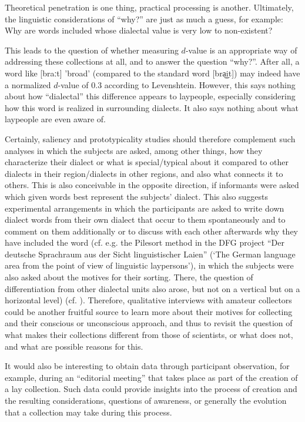 \documentclass[output=paper]{langscibook}
\begin{document}
\begin{sloppypar}
Theoretical penetration is one thing, practical processing is another. Ultimately, the linguistic considerations of “why?” are just as much a guess, for example: Why are words included whose dialectal value is very low to non-existent?
\end{sloppypar}

This leads to the question of whether measuring $d$-value is an appropriate way of addressing these collections at all, and to answer the question “why?”. After all, a word like [braːt] 'broad' (compared to the standard word [bra͜it]) may indeed have a normalized $d$-value of 0.3 according to Levenshtein. However, this says nothing about how “dialectal” this difference appears to laypeople, especially considering how this word is realized in surrounding dialects. It also says nothing about what laypeople are even aware of.

Certainly, saliency and prototypicality studies should therefore complement such analyses in which the subjects are asked, among other things, how they characterize their dialect or what is special/typical about it compared to other dialects in their region/dialects in other regions, and also what connects it to others. This is also conceivable in the opposite direction, if informants were asked which given words best represent the subjects’ dialect. This also suggests experimental arrangements in which the participants are asked to write down dialect words from their own dialect that occur to them spontaneously and to comment on them additionally or to discuss with each other afterwards why they have included the word (cf. e.g. the Pilesort method in the DFG project “Der deutsche Sprachraum aus der Sicht linguistischer Laien” (‘The German language area from the point of view of linguistic laypersons’), in which the subjects were also asked about the motives for their sorting. There, the question of differentiation from other dialectal units also arose, but not on a vertical but on a horizontal level) (cf. \citealt[52--54]{Schröder2017}). Therefore, qualitative interviews with amateur collectors could be another fruitful source to learn more about their motives for collecting and their conscious or unconscious approach, and thus to revisit the question of what makes their collections different from those of scientists, or what does not, and what are possible reasons for this.

It would also be interesting to obtain data through participant observation, for example, during an “editorial meeting” that takes place as part of the creation of a lay collection. Such data could provide insights into the process of creation and the resulting considerations, questions of awareness, or generally the evolution that a collection may take during this process.
\end{document}
